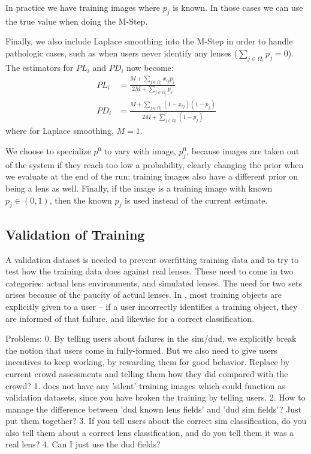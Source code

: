\documentclass[useAMS,usenatbib,a4paper]{mn2e}
\begin{document}
In practice we have training images where $p_{j}$ is known. In those
cases we can use the true value when doing the M-Step.

Finally, we also include Laplace smoothing into the M-Step in order to handle
pathologic cases, such as when users never identify any lenses ($\sum_{j \in
\Omega_{i}} p_j = 0$). The estimators for $PL_{i}$ and $PD_{i}$ now become:
\begin{align}
  PL_{i} &= \frac{M + \sum_{j \in \Omega_i} x_{ij} p_{j}}{2M + \sum_{j \in
\Omega_i} p_{j}} \\
  PD_{i} &= \frac{M + \sum_{j \in \Omega_i} (1 - x_{ij}) (1 - p_{j})}{2M + \sum_{j \in
\Omega_i} (1 - p_{j})}
\end{align}
where for Laplace smoothing, $M = 1$.

We choose to specialize $p^{0}$ to vary with
image, $p_{j}^{0}$, because images are taken out of the \sw system if they reach
too low a probability, clearly changing the prior when we evaluate at the end
of the run; training images also have a
different prior on being a lens as well. Finally, if the image is a training
image with known $p_j \in (0,1)$, then the known $p_j$ is used instead of
the current estimate.


\subsection{Validation of Training}
\label{sec:validation}


A validation dataset is needed to prevent overfitting training data and to try
to test how the training data does against real lenses. These need to come in
two categories: actual lens environments, and simulated lenses. The need for
two sets arises because of the paucity of actual lenses. In \SW, most training
objects are explicitly given to a user -- if a user incorrectly identifies a
training object, they are informed of that failure, and likewise for a correct
classification.

Problems:
0. By telling users about failures in the sim/dud, we explicitly break the
notion that users come in fully-formed. But we also need to give users
incentives to keep working, by rewarding them for good behavior. Replace by
current crowd assessments and telling them how they did compared with the
crowd?
1. \SW does not have any 'silent' training images which could function as
validation datasets, since you have broken the training by telling users.
2. How to manage the difference between 'dud known lens fields' and 'dud sim
fields'? Just put them together?
3. If you tell users about the correct sim classification, do you also tell
them about a correct lens classification, and do you tell them it was a real
lens?
4. Can I just use the dud fields?
\end{document}
